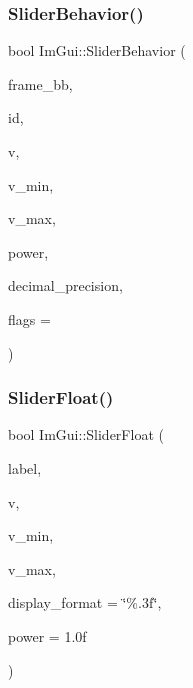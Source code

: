 \subsubsection{\texorpdfstring{Slider\+Behavior()}{SliderBehavior()}}
{\footnotesize\ttfamily bool Im\+Gui\+::\+Slider\+Behavior (\begin{DoxyParamCaption}\item[{const \mbox{\hyperlink{struct_im_rect}{Im\+Rect}} \&}]{frame\+\_\+bb,  }\item[{\mbox{\hyperlink{imgui_8h_a1785c9b6f4e16406764a85f32582236f}{Im\+Gui\+ID}}}]{id,  }\item[{float $\ast$}]{v,  }\item[{float}]{v\+\_\+min,  }\item[{float}]{v\+\_\+max,  }\item[{float}]{power,  }\item[{int}]{decimal\+\_\+precision,  }\item[{\mbox{\hyperlink{imgui__internal_8h_a50cc3e3e4beb155e2186f8c1dc057e18}{Im\+Gui\+Slider\+Flags}}}]{flags = {} }\end{DoxyParamCaption})}

\mbox{\label{namespace_im_gui_a7c12e66f74025376996b7ac6d1e3a476}} 
\subsubsection{\texorpdfstring{Slider\+Float()}{SliderFloat()}}
{\footnotesize\ttfamily bool Im\+Gui\+::\+Slider\+Float (\begin{DoxyParamCaption}\item[{const char $\ast$}]{label,  }\item[{float $\ast$}]{v,  }\item[{float}]{v\+\_\+min,  }\item[{float}]{v\+\_\+max,  }\item[{const char $\ast$}]{display\+\_\+format = {\ttfamily \char`\"{}\%.3f\char`\"{}},  }\item[{float}]{power = {\ttfamily 1.0f} }\end{DoxyParamCaption})}

\mbox{\label{namespace_im_gui_a0d5270d08284202523130e8b6ef66350}} 
